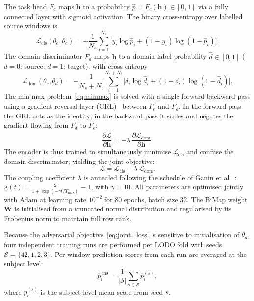 The task head $F_c$ maps $\mathbf{h}$ to a probability
$\hat{p} = F_c(\mathbf{h})\in[0,1]$ via a fully connected layer with sigmoid
activation.
The binary cross-entropy over labelled source windows is
\begin{equation}
  \mathcal{L}_\mathrm{cls}(\theta_e,\theta_c)
    = -\frac{1}{N_s}\sum_{i=1}^{N_s}
        \bigl[y_i\log\hat{p}_i + (1-y_i)\log(1-\hat{p}_i)\bigr].
  \label{eq:cls_loss}
\end{equation}
The domain discriminator $F_d$ maps $\mathbf{h}$ to a domain label probability
$\hat{d}\in[0,1]$ ($d=0$: source; $d=1$: target), with cross-entropy
\begin{equation}
  \mathcal{L}_\mathrm{dom}(\theta_e,\theta_d)
    = -\frac{1}{N_s+N_t}\sum_{i=1}^{N_s+N_t}
        \bigl[d_i\log\hat{d}_i + (1-d_i)\log(1-\hat{d}_i)\bigr].
  \label{eq:dom_loss}
\end{equation}
The min-max problem~\eqref{eq:minmax} is solved with a single forward-backward
pass using a gradient reversal layer (GRL)~\cite{ganin2017dann} between $F_e$
and $F_d$.
In the forward pass the GRL acts as the identity; in the backward pass it scales
and negates the gradient flowing from $F_d$ to $F_e$:
\begin{equation}
  \frac{\partial\tilde{\mathcal{L}}}{\partial\mathbf{h}}
    = -\lambda\,\frac{\partial\mathcal{L}_\mathrm{dom}}{\partial\mathbf{h}}.
  \label{eq:grl}
\end{equation}
The encoder is thus trained to simultaneously minimise $\mathcal{L}_\mathrm{cls}$
and confuse the domain discriminator, yielding the joint objective:
\begin{equation}
  \mathcal{L} = \mathcal{L}_\mathrm{cls} - \lambda\,\mathcal{L}_\mathrm{dom}.
  \label{eq:joint_loss}
\end{equation}
The coupling coefficient $\lambda$ is annealed following the schedule
of Ganin et al.~\cite{ganin2017dann}:
$\lambda(t) = \frac{2}{1+\exp(-\gamma t/T_{\max})} - 1$, with $\gamma=10$.
All parameters are optimised jointly with Adam at learning rate $10^{-2}$ for
80 epochs, batch size 32.
The BiMap weight $\mathbf{W}$ is initialised from a truncated normal distribution
and regularised by its Frobenius norm to maintain full row rank.

Because the adversarial objective~\eqref{eq:joint_loss} is sensitive to
initialisation of $\theta_d$, four independent training runs are performed per
LODO fold with seeds $\mathcal{S}=\{42,1,2,3\}$.
Per-window prediction scores from each run are averaged at the subject level:
\begin{equation}
  \hat{p}_i^{\,\mathrm{ens}}
    = \frac{1}{|\mathcal{S}|}\sum_{s\in\mathcal{S}}\hat{p}_i^{(s)},
  \label{eq:ensemble}
\end{equation}
where $\hat{p}_i^{(s)}$ is the subject-level mean score from seed $s$.

